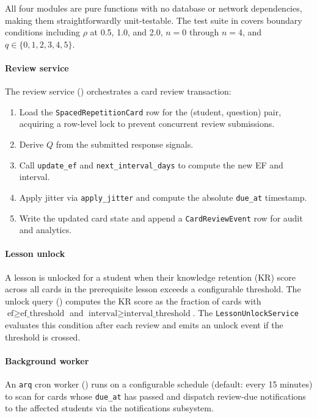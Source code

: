 All four modules are pure functions with no database or network dependencies, making them straightforwardly unit-testable. The test suite in  covers boundary conditions including $\rho$ at 0.5, 1.0, and 2.0, $n = 0$ through $n = 4$, and $q \in \{0, 1, 2, 3, 4, 5\}$.

\paragraph{Review service}
The review service () orchestrates a card review transaction:

\begin{enumerate}
    \item Load the \texttt{SpacedRepetitionCard} row for the (student, question) pair, acquiring a row-level lock to prevent concurrent review submissions.
    \item Derive $Q$ from the submitted response signals.
    \item Call \texttt{update\_ef} and \texttt{next\_interval\_days} to compute the new EF and interval.
    \item Apply jitter via \texttt{apply\_jitter} and compute the absolute \texttt{due\_at} timestamp.
    \item Write the updated card state and append a \texttt{CardReviewEvent} row for audit and analytics.
\end{enumerate}

\paragraph{Lesson unlock}
A lesson is unlocked for a student when their knowledge retention (KR) score across all cards in the prerequisite lesson exceeds a configurable threshold. The unlock query () computes the KR score as the fraction of cards with $\text{ef} \geq \text{ef\_threshold}$ and $\text{interval} \geq \text{interval\_threshold}$. The \texttt{LessonUnlockService} evaluates this condition after each review and emits an unlock event if the threshold is crossed.

\paragraph{Background worker}
An \texttt{arq} cron worker () runs on a configurable schedule (default: every 15 minutes) to scan for cards whose \texttt{due\_at} has passed and dispatch review-due notifications to the affected students via the notifications subsystem.

